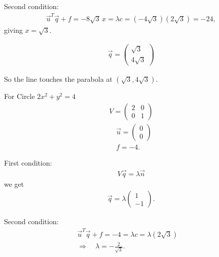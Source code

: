 \documentclass[journal]{IEEEtran}
\begin{document}
\noindent Second condition:
\begin{align}
\vec{u}^T \vec{q} + f = -8\sqrt{3}\,x = \lambda c = (-4\sqrt{3})(2\sqrt{3}) = -24,
\end{align}
giving $x = \sqrt{3}$.

\begin{align}
{\vec{q} = \begin{pmatrix}\sqrt{3} \\ 4\sqrt{3}\end{pmatrix}}
\end{align}

So the line touches the parabola at $(\sqrt{3}, 4\sqrt{3})$.

For Circle $2x^2 + y^2 = 4$
\begin{align}
V = \begin{pmatrix}2 & 0 \\ 0 & 1\end{pmatrix}\\
\quad 
\vec{u} = \begin{pmatrix}0 \\ 0\end{pmatrix}\\
\quad 
f = -4.
\end{align}

\noindent First condition:
\begin{align}
V\vec{q} = \lambda \vec{n}
\end{align}
we get 
\begin{align}
\vec{q} = \lambda \begin{pmatrix}1 \\ -1\end{pmatrix}.
\end{align}

\noindent Second condition:
\begin{align}
\vec{u}^T\vec{q} + f = -4 = \lambda c = \lambda(2\sqrt{3})
\quad \\ \Rightarrow \quad \lambda = -\frac{2}{\sqrt{3}}.
\end{align}
\end{document}
